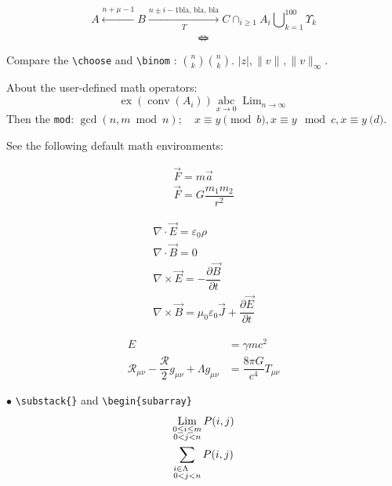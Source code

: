 \documentclass[12pt]{amsart}
\theoremstyle{plain}
\theoremstyle{definition}
\theoremstyle{remark}
\numberwithin{equation}{section} %
\newcommand{\calR}{\mathcal{R}}
\DeclareMathOperator*{\Lim}{Lim}
\DeclareMathOperator*{\intersect}{\cap}
\DeclareMathOperator*{\Union}{\bigcup}
\DeclareMathOperator{\ex}{ex}
\DeclareMathOperator{\co}{conv}
\providecommand{\abs}[1]{\lvert#1\rvert}
\providecommand{\norm}[2][]{\lVert#2\rVert_{#1}}
\begin{document}
\begin{equation}\label{eq:arrow}
	A \xleftarrow{n+\mu-1} B \xrightarrow[T]{n\pm i-1 \text{bla, bla, bla}}	C \intersect_{i\geq 1} A_{i} \Union_{k=1}^{100}\Upsilon_{k}
\end{equation}
\[ \Leftarrow \mspace{-18.0mu} \Rightarrow \] %

Compare the \verb|\choose| and \verb|\binom| : $ {n \choose k} \binom{n}{k}$. $ \abs{z}, \norm{v}, \norm[\infty]{v} $.

About the user-defined math operators:
\[ \ex(\co(A_{i})) \operatorname*{abc}_{x\to 0} \Lim_{n\to \infty}\]
Then the \verb|mod|: $ \gcd(n,m\bmod n); \quad x \equiv y \pmod b, x \equiv y \mod c, x \equiv y \pod d $.

See the following default math environments:

\begin{multline}\label{eq:newton}
	\vec{F} = m\vec{a} \\
	\vec{F} = G \dfrac{m_{1}m_{2}}{r^{2}}
\end{multline}

\begin{subequations}\label{eq:maxwell}
	\begin{gather}
		\nabla\cdot \vec{E} = \varepsilon_{0}\rho \\
		\nabla \cdot \vec{B} = 0 \\
		\nabla \times \vec{E} = -\dfrac{\partial \vec{B}}{\partial t}\\
		\nabla \times \vec{B} = \mu_{0}\varepsilon_{0} \vec{J} + \dfrac{\partial \vec{E}}{\partial t}
	\end{gather}
\end{subequations}

\begin{equation}\label{eq:einstein}
	\begin{split}
		E& =\gamma mc^{2}
		\\
		\calR_{\mu\nu} - \dfrac{\calR}{2}g_{\mu\nu} + \Lambda g_{\mu\nu} & = \dfrac{8\pi G}{c^{4}} T_{\mu\nu}
	\end{split}
\end{equation}

$\bullet$ \verb|\substack{}| and \verb|\begin{subarray}|
\begin{gather}
	\Lim_{\substack{0\leq i \leq m\\ 0<j<n} } P(i,j)\\
	\sum_{\begin{subarray}{r}
			i\in \Lambda \\ 0<j<n
		\end{subarray}} P(i,j)
\end{gather}
\end{document}
